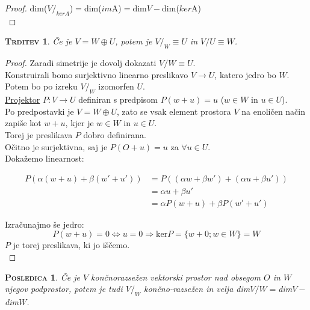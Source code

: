 \documentclass[a4paper,12pt]{article}
\newtheorem*{trditev}{\textsc{Trditev}}
\newtheorem*{posledica}{\textsc{Posledica}}
\begin{document}
\begin{proof}
	dim($V/_{kerA}$)$=$dim($im$A)$=$dim$V-$dim($ker$A) \\
\end{proof}

\begin{trditev}
	Če je $V=W\oplus U$, potem je $V/_W \equiv U$ in $V/U \equiv W$.\\
\end{trditev}

\begin{proof}
	Zaradi simetrije je dovolj dokazati $V/W \equiv U$. \\

	Konstruirali bomo surjektivno linearno preslikavo $V\to U$, katero jedro bo $W$. \\

	Potem bo po izreku $V/_W$ izomorfen $U$. \\

	\underline{Projektor} $P:V\to U$ definiran s predpisom $P(w+u)=u$ ($w\in W$ in $u\in U$). \\

	Po predpostavki je $V=W\oplus U$, zato se vsak element prostora $V$ na enoličen način zapiše kot $w+u$, kjer je $w\in W$ in $u\in U$. \\

	Torej je preslikava $P$ dobro definirana. \\

	Očitno je surjektivna, saj je $P(O+u)=u$ za $\forall u\in U$. \\

	Dokažemo linearnost: 

	\begin{align*}
		P(\alpha(w+u)+\beta(w'+u'))&=P((\alpha w + \beta w')+(\alpha u+\beta u')) \\
		&= \alpha u + \beta u' \\
		&= \alpha P(w+u)+\beta P(w'+u')
	\end{align*}

	Izračunajmo še jedro:
	\begin{equation*}
		P(w+u)=0 \Leftrightarrow u=0 \Rightarrow \text{ker}P=\{w+0;w\in W\}=W
	\end{equation*}
	$P$ je torej preslikava, ki jo iščemo.\\
\end{proof}

\begin{posledica}
	Če je $V$ končnorazsežen vektorski prostor nad obsegom $O$ in $W$ njegov podprostor, potem je tudi $V/_W$ končno-razsežen in velja dim$V/W=$dim$V-$dim$W$. \\
\end{posledica}
\end{document}

